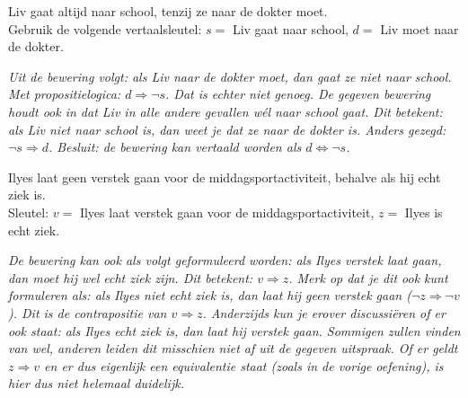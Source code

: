 \begin{werktekstoef}
\item{Liv gaat altijd naar school, tenzij ze naar de dokter moet.\\ Gebruik de volgende vertaalsleutel: $s =$ Liv gaat naar school, $d =$ Liv moet naar de dokter.}

\emph{Uit de bewering volgt: als Liv naar de dokter moet, dan gaat ze niet naar school. Met propositielogica: $d\Rightarrow \lnot s$. Dat is echter  niet genoeg. De gegeven bewering houdt ook in dat Liv in alle andere gevallen wél naar school gaat. Dit betekent: als Liv niet naar school is, dan weet je dat ze naar de dokter is. Anders gezegd: $\lnot s \Rightarrow d$. Besluit: de bewering kan vertaald worden als $d\Leftrightarrow \lnot s$.}



\item{Ilyes laat geen verstek gaan voor de middagsportactiviteit, behalve als hij echt ziek is.\\ Sleutel: $v =$ Ilyes laat verstek gaan voor de middagsportactiviteit, $z =$ Ilyes is echt ziek.}

\emph{De bewering kan ook als volgt geformuleerd worden: als Ilyes verstek laat gaan, dan moet hij wel echt ziek zijn. Dit betekent: $v \Rightarrow z$. Merk op dat je dit ook kunt formuleren als: als Ilyes niet echt ziek is, dan laat hij geen verstek gaan ($\lnot z \Rightarrow \lnot v$). Dit is de contrapositie van $v \Rightarrow z$. Anderzijds kun je erover discussiëren of er ook staat: als Ilyes echt ziek is, dan laat hij verstek gaan. Sommigen zullen vinden van wel, anderen leiden dit misschien niet af uit de gegeven uitspraak. Of er geldt $z \Rightarrow v$ en er dus eigenlijk een equivalentie staat (zoals in de vorige oefening), is hier dus niet helemaal duidelijk.}





\end{werktekstoef}

